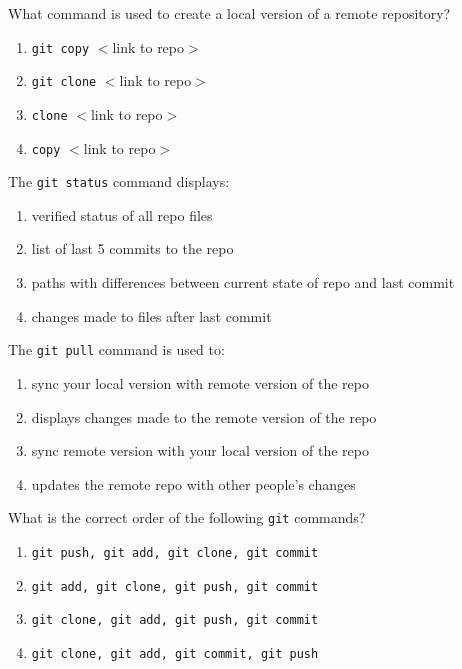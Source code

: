 \documentclass[12pt,fleqn]{examtst}
\begin{document}

\renewcommand{\labelenumi}{\Alph{enumi}.}


\noindent
\begin{minipage}{\textwidth}

What command is used to create a local version of a remote repository?

\begin{enumerate}
    \item \lstinline{git copy} $<$link to repo$>$
    \item \lstinline{git clone} $<$link to repo$>$
    \item \lstinline{clone} $<$link to repo$>$
    \item \lstinline{copy} $<$link to repo$>$
\end{enumerate}

The \lstinline{git status} command displays:

\begin{enumerate}
    \item verified status of all repo files
    \item list of last 5 commits to the repo
    \item paths with differences between current state of repo and last commit
    \item changes made to files after last commit
\end{enumerate}

The \lstinline{git pull} command is used to:

\begin{enumerate}
    \item sync your local version with remote version of the repo
    \item displays changes made to the remote version of the repo
    \item sync remote version with your local version of the repo
    \item updates the remote repo with other people's changes
\end{enumerate}

What is the correct order of the following \lstinline{git} commands?

\begin{enumerate}
    \item \lstinline{git push, git add, git clone, git commit}
    \item \lstinline{git add, git clone, git push, git commit}
    \item \lstinline{git clone, git add, git push, git commit}
    \item \lstinline{git clone, git add, git commit, git push}
\end{enumerate}

\end{minipage}
\end{document}
